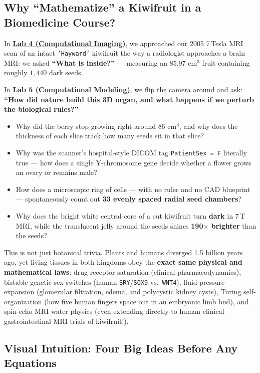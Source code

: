 \documentclass[10.5pt,a4paper]{article}
\begin{document}
\subsection{Why ``Mathematize'' a Kiwifruit in a Biomedicine Course?}

In \href{https://github.com/arvidl/BMED365-2027/tree/main/Lab4-Comp-Imag/Kiwi-challenge}{\textbf{Lab 4 (Computational Imaging)}}, we approached our 2005 7\,Tesla MRI scan of an intact \texttt{'Hayward'} kiwifruit the way a radiologist approaches a brain MRI: we asked \textbf{``What is inside?''} --- measuring an $85.97\text{ cm}^3$ fruit containing roughly $1{,}440$ dark seeds.

In \textbf{Lab 5 (Computational Modeling)}, we flip the camera around and ask: \textbf{``How did nature build this 3D organ, and what happens if we perturb the biological rules?''}
\begin{itemize}
    \item Why did the berry stop growing right around $86\text{ cm}^3$, and why does the thickness of each slice track how many seeds sit in that slice?
    \item Why was the scanner's hospital-style DICOM tag \texttt{PatientSex = F} literally true --- how does a single Y-chromosome gene decide whether a flower grows an ovary or remains male?
    \item How does a microscopic ring of cells --- with no ruler and no CAD blueprint --- spontaneously count out \textbf{33 evenly spaced radial seed chambers}?
    \item Why does the bright white central core of a cut kiwifruit turn \textbf{dark} in 7\,T MRI, while the translucent jelly around the seeds shines \textbf{190$\times$ brighter} than the seeds?
\end{itemize}

This is not just botanical trivia. Plants and humans diverged 1.5 billion years ago, yet living tissues in both kingdoms obey the \textbf{exact same physical and mathematical laws}: drug-receptor saturation (clinical pharmacodynamics), bistable genetic sex switches (human \texttt{SRY}/\texttt{SOX9} vs.\ \texttt{WNT4}), fluid-pressure expansion (glomerular filtration, edema, and polycystic kidney cysts), Turing self-organization (how five human fingers space out in an embryonic limb bud), and spin-echo MRI water physics (even extending directly to human clinical gastrointestinal MRI trials of kiwifruit!).

\subsection{Visual Intuition: Four Big Ideas Before Any Equations}
\end{document}
